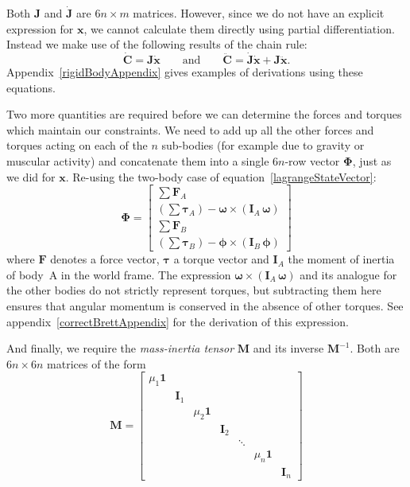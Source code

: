 Both $\mathbf{J}$ and $\dot{\mathbf{J}}$ are $6n\times m$ matrices. However, since we do not
have an explicit expression for $\mathbf{x}$, we cannot calculate them directly using
partial differentiation. Instead we make use of the following results of the chain rule:
\begin{equation}
\label{cDotAndCDDot}
\dot{\mathbf{C}} = \mathbf{J}\dot{\mathbf{x}} \quad\quad\mathrm{and}\quad\quad
\ddot{\mathbf{C}} = \dot{\mathbf{J}}\dot{\mathbf{x}} + \mathbf{J}\ddot{\mathbf{x}}.
\end{equation}
Appendix~\ref{rigidBodyAppendix} gives examples of derivations using these equations.

Two more quantities are required before we can determine the forces and torques which maintain
our constraints. We need to add up all the other forces and torques acting on each of the $n$
sub-bodies (for example due to gravity or muscular activity) and concatenate them into a single
$6n$-row vector $\bm{\Phi}$, just as we did for $\mathbf{x}$. Re-using the two-body case of
equation~\ref{lagrangeStateVector}:
\begin{equation}
\bm{\Phi} = \left[\begin{array}{l}
    \sum \mathbf{F}_A \\
    \left( \sum \bm{\tau}_A \right) - \bm{\omega}\times(\mathbf{I}_A\,\bm{\omega}) \\
    \sum \mathbf{F}_B \\
    \left( \sum \bm{\tau}_B \right) - \bm{\phi}\times(\mathbf{I}_B\,\bm{\phi})
    \end{array}\right]
\end{equation}
where $\mathbf{F}$ denotes a force vector, $\bm{\tau}$ a torque vector and $\mathbf{I}_A$
the moment of inertia of body~A in the world frame. The expression
$\bm{\omega}\times(\mathbf{I}_A\,\bm{\omega})$ and its analogue for the other bodies do
not strictly represent torques, but subtracting them here ensures that angular momentum is
conserved in the absence of other torques. See appendix~\ref{correctBrettAppendix} for the
derivation of this expression.

And finally, we require the {\em mass-inertia tensor} $\mathbf{M}$ and its inverse
$\mathbf{M}^{-1}$. Both are $6n\times6n$ matrices of the form
\begin{equation}
\label{massInertiaTensor}
\mathbf{M} = \left[ \begin{array}{ccccccc}
    \mu_1\mathbf{1} \\ & \mathbf{I}_1 \\ &&
    \mu_2\mathbf{1} \\ &&& \mathbf{I}_2 \\ &&&& \ddots \\ &&&&&
    \mu_n\mathbf{1} \\ &&&&&& \mathbf{I}_n
    \end{array}\right]
\end{equation}

